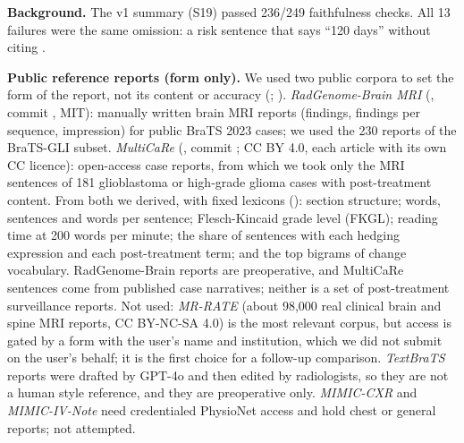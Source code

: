 \documentclass[11pt,a4paper]{article}
\begin{document}
\textbf{Background.} The v1 summary (S19) passed 236/249 faithfulness checks. All 13 failures were the same omission:
a risk sentence that says ``120 days'' without citing .

\textbf{Public reference reports (form only).} We used two public corpora to set the form of the report, not its
content or accuracy (; ).
\emph{RadGenome-Brain MRI} (, commit , MIT): manually written
brain MRI reports (findings, findings per sequence, impression) for public BraTS 2023 cases; we used the 230 reports
of the BraTS-GLI subset. \emph{MultiCaRe} (, commit ; CC BY 4.0,
each article with its own CC licence): open-access case reports, from which we took only the MRI sentences of 181
glioblastoma or high-grade glioma cases with post-treatment content. From both we derived, with fixed lexicons
(): section structure; words, sentences and words per sentence; Flesch-Kincaid grade level (FKGL);
reading time at 200 words per minute; the share of sentences with each hedging expression and each post-treatment
term; and the top bigrams of change vocabulary. RadGenome-Brain reports are preoperative, and MultiCaRe sentences
come from published case narratives; neither is a set of post-treatment surveillance reports. Not used:
\emph{MR-RATE} (about 98,000 real clinical brain and spine MRI reports, CC BY-NC-SA 4.0) is the most relevant corpus,
but access is gated by a form with the user's name and institution, which we did not submit on the user's behalf; it
is the first choice for a follow-up comparison. \emph{TextBraTS} reports were drafted by GPT-4o and then edited by
radiologists, so they are not a human style reference, and they are preoperative only. \emph{MIMIC-CXR} and
\emph{MIMIC-IV-Note} need credentialed PhysioNet access and hold chest or general reports; not attempted.
\end{document}
